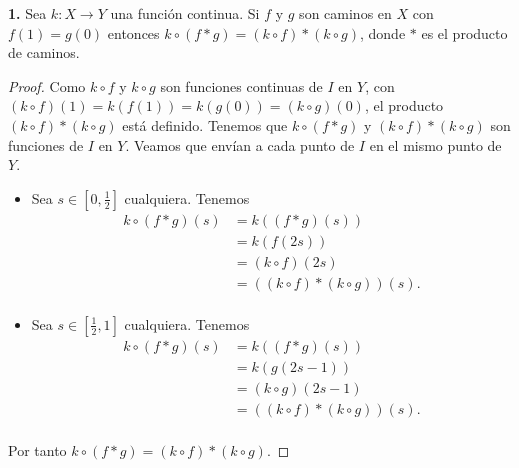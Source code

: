\textbf{1.} Sea $k:X\to Y$ una función continua. Si $f$ y $g$ son caminos en $X$ con $f(1)=g(0)$ entonces $k\circ (f*g)=(k\circ f)*(k\circ g)$, donde $*$ es el producto de caminos.
\begin{proof}
   Como $k\circ f$ y $k\circ g$ son funciones continuas de $I$ en $Y$, con $(k\circ f)(1)=k(f(1))=k(g(0))=(k\circ g)(0)$, el producto $(k\circ f)*(k\circ g)$ está definido. Tenemos que $k\circ (f*g)$ y $(k\circ f)*(k\circ g)$ son funciones de $I$ en $Y$. Veamos que envían a cada punto de $I$ en el mismo punto de $Y$.
   \begin{itemize}
      \item Sea $s\in[0,\frac{1}{2}]$ cualquiera. Tenemos
         $$
         \begin{aligned}
           k\circ(f*g)(s) &= k((f*g)(s))\\
                          &= k(f(2s))\\
                          &= (k\circ f)(2s)\\
                          &= ((k\circ f)*(k\circ g))(s).\\
         \end{aligned}
         $$
      \item Sea $s\in [\frac{1}{2},1]$ cualquiera. Tenemos
         $$
         \begin{aligned}
           k\circ(f*g)(s) &= k((f*g)(s))\\
                          &= k(g(2s-1))\\
                          &= (k\circ g)(2s-1)\\
                          &= ((k\circ f)*(k\circ g))(s).\\
         \end{aligned}
         $$
   \end{itemize}
   Por tanto $k\circ(f*g)=(k\circ f)*(k\circ g)$.
\end{proof}


